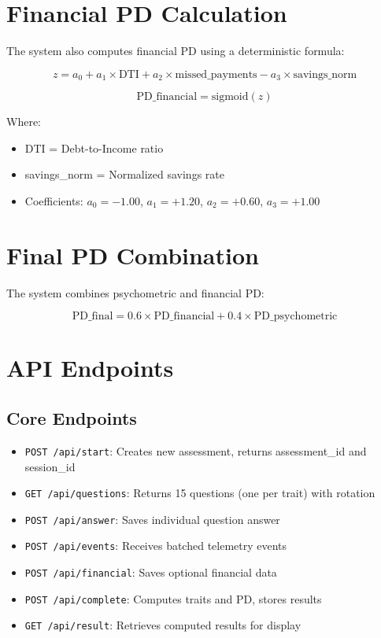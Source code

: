 \documentclass[11pt,a4paper]{article}
\begin{document}
\section{Financial PD Calculation}

The system also computes financial PD using a deterministic formula:

\begin{equation}
z = a_0 + a_1 \times \text{DTI} + a_2 \times \text{missed\_payments} - a_3 \times \text{savings\_norm}
\end{equation}

\begin{equation}
\text{PD\_financial} = \text{sigmoid}(z)
\end{equation}

Where:
\begin{itemize}
    \item DTI = Debt-to-Income ratio
    \item savings\_norm = Normalized savings rate
    \item Coefficients: $a_0 = -1.00$, $a_1 = +1.20$, $a_2 = +0.60$, $a_3 = +1.00$
\end{itemize}

\section{Final PD Combination}

The system combines psychometric and financial PD:

\begin{equation}
\text{PD\_final} = 0.6 \times \text{PD\_financial} + 0.4 \times \text{PD\_psychometric}
\end{equation}

\section{API Endpoints}

\subsection{Core Endpoints}
\begin{itemize}
    \item \texttt{POST /api/start}: Creates new assessment, returns assessment\_id and session\_id
    \item \texttt{GET /api/questions}: Returns 15 questions (one per trait) with rotation
    \item \texttt{POST /api/answer}: Saves individual question answer
    \item \texttt{POST /api/events}: Receives batched telemetry events
    \item \texttt{POST /api/financial}: Saves optional financial data
    \item \texttt{POST /api/complete}: Computes traits and PD, stores results
    \item \texttt{GET /api/result}: Retrieves computed results for display
\end{itemize}
\end{document}
